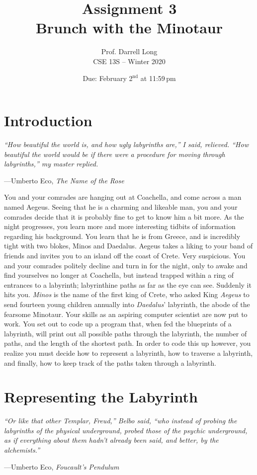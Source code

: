 \documentclass[11pt]{article}
\title{Assignment 3 \\ Brunch with the Minotaur}
\author{Prof. Darrell Long \\
CSE 13S -- Winter 2020}
\date{Due: February 2$^\text{nd}$ at 11:59\,pm}
\begin{document}
\maketitle


\section{Introduction}

\textwidth \epigraph{\emph{``How beautiful the world is, and
how ugly labyrinths are,'' I said, relieved. ``How beautiful the world would be
if there were a procedure for moving through labyrinths,'' my master
replied.}}{---Umberto Eco, \emph{The Name of the Rose}}

\noindent You and your comrades are hanging out at Coachella, and come across a
man named Aegeus.  Seeing that he is a charming and likeable man, you and your
comrades decide that it is probably fine to get to know him a bit more. As the
night progresses, you learn more and more interesting tidbits of information
regarding his background.  You learn that he is from Greece, and is incredibly
tight with two blokes, Minos and Daedalus.  Aegeus takes a liking to your band
of friends and invites you to an island off the coast of Crete. Very
suspicious.  You and your comrades politely decline and turn in for the night,
only to awake and find yourselves no longer at Coachella, but instead trapped
within a ring of entrances to a labyrinth; labyrinthine paths as far as the eye
can see. Suddenly it hits you.  \emph{Minos} is the name of the first king of
Crete, who asked King \emph{Aegeus} to send fourteen young children annually
into \emph{Daedalus}' labyrinth, the abode of the fearsome Minotaur. Your
skills as an aspiring computer scientist are now put to work. You set out to
code up a program that, when fed the blueprints of a labyrinth, will print out
all possible paths through the labyrinth, the number of paths, and the length of
the shortest path.  In order to code this up however, you realize you must
decide how to represent a labyrinth, how to traverse a labyrinth, and finally,
how to keep track of the paths taken through a labyrinth.

\section{Representing the Labyrinth}
\textwidth
\epigraph{\emph{ ``Or like that other Templar, Freud,'' Belbo said, ``who
instead of probing the labyrinths of the physical underground, probed those of
the psychic underground, as if everything about them hadn't already been said,
and better, by the alchemists.''}}{---Umberto Eco, \emph{Foucault's Pendulum}}
\end{document}
